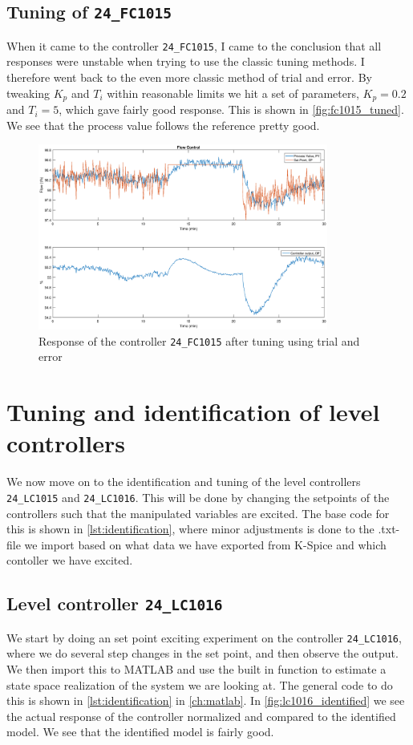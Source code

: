 \subsection{Tuning of \texttt{24\_FC1015}}
When it came to the controller \texttt{24\_FC1015}, I came to the conclusion that all responses were unstable when trying to use the classic tuning methods. I therefore went back to the even more classic method of trial and error. By tweaking $K_p$ and $T_i$ within reasonable limits we hit a set of parameters, $K_p = 0.2$ and $T_i = 5$, which gave fairly good response. This is shown in \autoref{fig:fc1015_tuned}. We see that the process value follows the reference pretty good.

\begin{figure}[ht!]
	\centering
	\includegraphics[width=0.85\textwidth]{fig/tuning/FC1015_tuned.eps}
	\caption{Response of the controller \texttt{24\_FC1015} after tuning using trial and error}
	\label{fig:fc1015_tuned}
\end{figure}

\clearpage
\section{Tuning and identification of level controllers}\label{sec:levelcontrollers}
We now move on to the identification and tuning of the level controllers \texttt{24\_LC1015} and \texttt{24\_LC1016}. This will be done by changing the setpoints of the controllers such that the manipulated variables are excited. The base code for this is shown in \autoref{lst:identification}, where minor adjustments is done to the .txt-file we import based on what data we have exported from K-Spice and which contoller we have excited.

\subsection{Level controller \texttt{24\_LC1016}}\label{ssec:lc1016}
We start by doing an set point exciting experiment on the controller \texttt{24\_LC1016}, where we do several step changes in the set point, and then observe the output. We then import this to MATLAB and use the built in function  to estimate a state space realization of the system we are looking at. The general code to do this is shown in \autoref{lst:identification} in \autoref{ch:matlab}. In \autoref{fig:lc1016_identified} we see the actual response of the controller  normalized and compared to the identified model. We see that the identified model is fairly good. 

